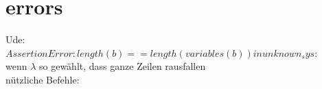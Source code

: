 \documentclass[arbeit=studie,oneside,BCOR=12mm]{ArbeitRST}
\begin{document}
\section{errors}
Ude:\\
$AssertionError: length(b) == length(variables(b)) in unknown_sys:$\\
wenn $\lambda$ so gewählt, dass ganze Zeilen rausfallen\\
nützliche Befehle: %

\nocite{Mik57de}

\printbibliography
\end{document}
